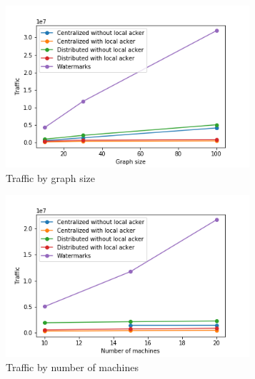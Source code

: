 \begin{figure}[t!]
    \begin{subfigure}[b]{0.32\textwidth}
            \includegraphics[width=0.99\textwidth]{pics/traffic_by_graph_size.png}
            \caption{Traffic by graph size}
    \end{subfigure}
    \hspace{5mm}
    \begin{subfigure}[b]{0.32\textwidth}
            \includegraphics[width=0.99\textwidth]{pics/traffic_by_number_of_machines.png}
            \caption{Traffic by number of machines}
    \end{subfigure}
    \hspace{5mm}
    \begin{subfigure}[b]{0.32\textwidth}

\end{subfigure}
\end{figure}
